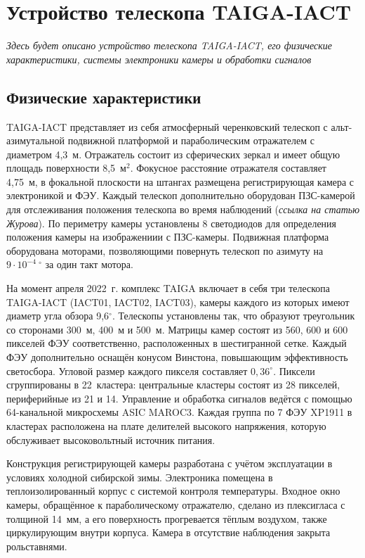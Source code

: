 \documentclass[magd,floatypics,numeref]{msudipl} %
\begin{document}
\section{Устройство телескопа TAIGA-IACT}
\textit{
Здесь будет описано устройство телескопа TAIGA-IACT, его физические характеристики, системы электроники камеры и обработки сигналов
}
\subsection{Физические характеристики}
TAIGA-IACT представляет из себя атмосферный черенковский телескоп с альт-азимутальной подвижной платформой и параболическим отражателем с диаметром 4,3~м. Отражатель состоит из сферических зеркал и имеет общую площадь поверхности 8,5~$\text{м}^\text{2}$. Фокусное расстояние отражателя составляет 4,75~м, в фокальной плоскости на штангах размещена регистрирующая камера с электроникой и ФЭУ.  Каждый телескоп дополнительно оборудован ПЗС-камерой для отслеживания положения телескопа во время наблюдений (\textit{ссылка на статью Журова}). По периметру камеры установлены 8 светодиодов для определения положения камеры на изображениии с ПЗС-камеры. Подвижная платформа оборудована моторами, позволяющими повернуть телескоп по азимуту на $9\cdot10^{-4}~^{\circ}$ за один такт мотора. 

На момент апреля 2022~г. комплекс TAIGA включает в себя три телескопа TAIGA-IACT (IACT01, IACT02, IACT03), камеры каждого из которых имеют диаметр угла обзора 9{,}6$^{\circ}$. Телескопы установлены так, что образуют треугольник со сторонами 300~м, 400~м и 500~м. Матрицы камер состоят из 560, 600 и 600 пикселей ФЭУ соответственно, расположенных в шестигранной сетке. Каждый ФЭУ дополнительно оснащён конусом Винстона, повышающим эффективность светосбора. Угловой размер каждого пикселя составляет $0,\!36^{\circ}$. Пиксели сгруппированы в 22~кластера: центральные кластеры состоят из 28 пикселей, периферийные из 21 и 14. Управление и обработка сигналов ведётся с помощью 64-канальной микросхемы ASIC MAROC3. Каждая группа по 7 ФЭУ XP1911 в кластерах расположена на плате делителей высокого напряжения, которую обслуживает высоковольтный источник питания. 

Конструкция регистрирующей камеры разработана с учётом эксплуатации в условиях холодной сибирской зимы. Электроника помещена в теплоизолированный корпус с системой контроля температуры. Входное окно камеры, обращённое к параболическому отражателю, сделано из плексигласа с толщиной 14~мм, а его поверхность прогревается тёплым воздухом, также циркулирующим внутри корпуса. Камера в отсутствие наблюдения закрыта рольставнями.
\end{document}
